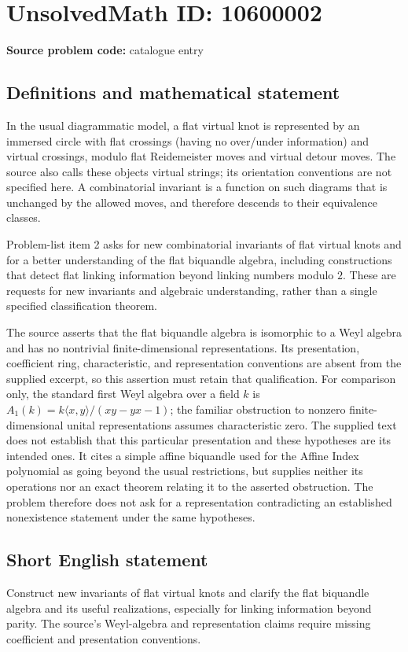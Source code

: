 \documentclass[11pt]{article}
\begin{document}
\section*{UnsolvedMath ID: 10600002}
\textbf{Source problem code:} catalogue entry
\subsection{Definitions and mathematical statement}
In the usual diagrammatic model, a flat virtual knot is represented by an immersed circle with flat crossings (having no over/under information) and virtual crossings, modulo flat Reidemeister moves and virtual detour moves. The source also calls these objects virtual strings; its orientation conventions are not specified here. A combinatorial invariant is a function on such diagrams that is unchanged by the allowed moves, and therefore descends to their equivalence classes.

Problem-list item 2 asks for new combinatorial invariants of flat virtual knots and for a better understanding of the flat biquandle algebra, including constructions that detect flat linking information beyond linking numbers modulo $2$. These are requests for new invariants and algebraic understanding, rather than a single specified classification theorem.

The source asserts that the flat biquandle algebra is isomorphic to a Weyl algebra and has no nontrivial finite-dimensional representations. Its presentation, coefficient ring, characteristic, and representation conventions are absent from the supplied excerpt, so this assertion must retain that qualification. For comparison only, the standard first Weyl algebra over a field $k$ is $A_1(k)=k\langle x,y\rangle/(xy-yx-1)$; the familiar obstruction to nonzero finite-dimensional unital representations assumes characteristic zero. The supplied text does not establish that this particular presentation and these hypotheses are its intended ones. It cites a simple affine biquandle used for the Affine Index polynomial as going beyond the usual restrictions, but supplies neither its operations nor an exact theorem relating it to the asserted obstruction. The problem therefore does not ask for a representation contradicting an established nonexistence statement under the same hypotheses.
\subsection{Short English statement}
Construct new invariants of flat virtual knots and clarify the flat biquandle algebra and its useful realizations, especially for linking information beyond parity. The source's Weyl-algebra and representation claims require missing coefficient and presentation conventions.
\end{document}
